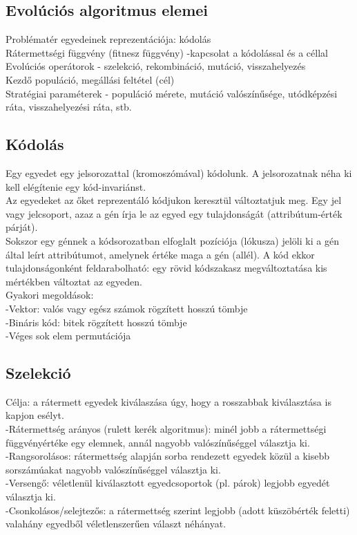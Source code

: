 \documentclass{article}
\begin{document}
	 \subsection{Evolúciós algoritmus elemei}
	 Problématér egyedeinek reprezentációja: kódolás\\
	 Rátermettségi függvény (fitnesz függvény) -kapcsolat a kódolással és a céllal\\
	 Evolúciós operátorok - szelekció, rekombináció, mutáció, visszahelyezés\\
	 Kezdő populáció, megállási feltétel (cél)\\
	 Stratégiai paraméterek - populáció mérete, mutáció valószínűsége, utódképzési ráta, visszahelyezési ráta, stb.\\
	 
	 \subsection{Kódolás}
	 Egy egyedet egy jelsorozattal (kromoszómával) kódolunk. A jelsorozatnak néha ki kell elégítenie egy kód-invariánst.\\
	 Az egyedeket az őket reprezentáló kódjukon keresztül változtatjuk meg. Egy jel vagy jelcsoport, azaz a gén írja le az egyed egy tulajdonságát (attribútum-érték párját).\\
	 Sokszor egy génnek a kódsorozatban elfoglalt pozíciója (lókusza) jelöli ki a gén által leírt attribútumot, amelynek értéke maga a gén (allél). A kód ekkor tulajdonságonként feldarabolható: egy rövid kódszakasz megváltoztatása kis mértékben változtat az egyeden.\\
	 Gyakori megoldások: \\
	 -Vektor: valós vagy egész számok rögzített hosszú tömbje\\
	 -Bináris kód: bitek rögzített hosszú tömbje \\
	 -Véges sok elem permutációja\\
	 
	 \subsection{Szelekció}
	 Célja: a rátermett egyedek kiválaszása úgy, hogy a rosszabbak kiválasztása is kapjon esélyt.\\
	 -Rátermettség arányos (rulett kerék algoritmus): minél jobb a rátermettségi függvényértéke egy elemnek, annál nagyobb valószínűséggel választja ki.\\
	 -Rangsorolásos: rátermettség alapján sorba rendezett egyedek közül a kisebb sorszámúakat nagyobb valószínűséggel választja ki.\\
	 -Versengő: véletlenül kiválasztott egyedcsoportok (pl. párok) legjobb egyedét választja ki.\\
	 -Csonkolásos/selejtezős: a rátermettség szerint legjobb (adott küszöbérték feletti) valahány egyedből véletlenszerűen választ néhányat.
	 
\end{document}
